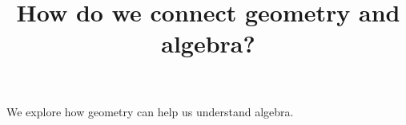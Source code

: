 \documentclass{ximera}
\title{How do we connect geometry and algebra?}
\begin{document}
\begin{abstract}
\end{abstract}
\maketitle

We explore how geometry can help us understand algebra.
\end{document}
